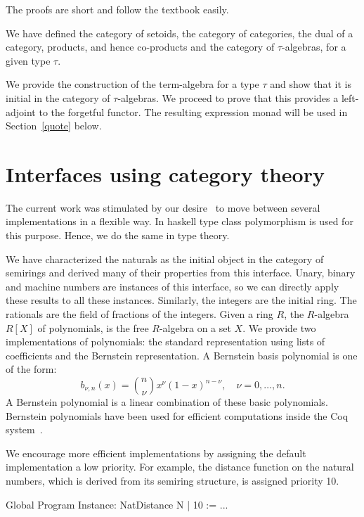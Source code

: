 \documentclass[a4paper,10pt, runningheads]{llncs}
\begin{document}
The proofs are short and follow the textbook easily.

We have defined the category of setoids, the category of categories, the dual of a category,
products, and hence co-products and the category of $\tau$-algebras, for a given type $\tau$.

We provide the construction of the term-algebra for a type $\tau$ and show that it is
initial in the category of $\tau$-algebras. We proceed to prove that this provides a left-adjoint
to the forgetful functor. The resulting expression monad will be used in Section~\ref{quote} below.

\section{Interfaces using category theory}\label{interfaces}\label{modul}
The current work was stimulated by our desire~\cite{Riemann} to move between several
implementations in a flexible way. In haskell type class polymorphism is used for this purpose.
Hence, we do the same in type theory.

We have characterized the naturals as the initial object in the category of semirings and derived
many of their properties from this interface. Unary, binary and machine numbers are
instances of this interface, so we can directly apply these results to all these instances.
Similarly, the integers are the initial ring. The rationals are the field of fractions of the
integers. 
Given a ring $R$, the $R$-algebra $R[X]$ of polynomials, is the free $R$-algebra on a set $X$.
We provide two implementations of polynomials: the
standard representation using lists of coefficients and the Bernstein representation. A Bernstein
basis polynomial is one of the form:
\[b_{\nu,n}(x) = {n \choose \nu} x^{\nu} \left( 1 - x \right)^{n - \nu}, \quad \nu = 0, \ldots, n.\]
A Bernstein polynomial is a linear combination of these basic polynomials. Bernstein polynomials
have been used for efficient computations inside the Coq system~\cite{ZumkellerPhD}.

We encourage more efficient implementations by assigning the default implementation a
low priority. For example, the distance function on the natural numbers, which is derived from its
semiring structure, is assigned priority 10.
\begin{code}
  Global Program Instance: NatDistance N | 10 := ...
\end{code}

\end{document}
